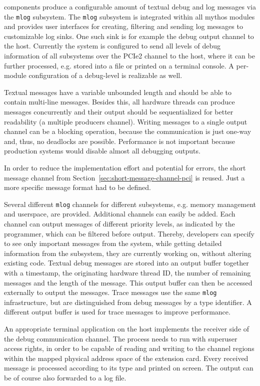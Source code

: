 \mythos components produce a configurable amount of textual debug and log
messages via the \texttt{mlog} subsystem.  The \texttt{mlog} subsystem is
integrated within all mythos modules and provides user interfaces for creating,
filtering and sending log messages to customizable log sinks. One such sink is
for example the debug output channel to the host. Currently the system is
configured to send all levels of debug information of all subsystems over the
PCIe2 channel to the host, where it can be further processed, e.g. stored into a
file or printed on a terminal console. A per-module configuration of a
debug-level is realizable as well.

Textual messages have a variable unbounded length and should be able to contain
multi-line messages. Besides this, all hardware threads can produce messages
concurrently and their output should be sequentialized for better readability
(a multiple producers channel). Writing messages to a single output channel can
be a blocking operation, because the communication is just one-way and, thus, no
deadlocks are possible. Performance is not important because production systems
would disable almost all debugging outputs.

In order to reduce the implementation effort and potential for errors,
the short message channel from Section~\ref{sec:short-message-channel-pci} is
reused. Just a more specific message format had to be defined.

Several different \texttt{mlog} channels for different subsystems, e.g. memory management and userspace, are provided.
Additional channels can easily be added. Each channel can output messages of different priority levels, as indicated by the programmer, which can be filtered before output. Thereby, developers can specify to see only important messages from the system, while getting detailed information from the subsystem, they are currently working on, without altering existing code.
Textual debug messages are stored into an output buffer together with a timestamp, the originating hardware thread ID, the number of remaining messages and the length of the message. This output buffer can then be accessed externally to output the messages.
Trace messages use the same \texttt{mlog} infrastructure, but are distinguished from debug messages by a type identifier. A different output buffer is used for trace messages to improve performance.

An appropriate terminal application on the host implements the receiver side of
the debug communication channel. The process needs to run with superuser access
rights, in order to be capable of reading and writing to the channel regions
within the mapped physical address space of the extension card. Every received
message is processed according to its type and printed on screen. The output can
be of course also forwarded to a log file.

